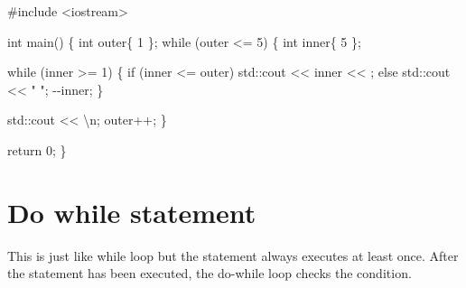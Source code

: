 \documentclass[
  letterpaper,
  DIV=11,
  numbers=noendperiod]{scrreprt}
\newenvironment{Shaded}{\begin{snugshade}}{\end{snugshade}}
\newcommand{\CommentTok}[1]{\textcolor[rgb]{0.37,0.37,0.37}{#1}}
\newcommand{\ControlFlowTok}[1]{\textcolor[rgb]{0.00,0.23,0.31}{#1}}
\newcommand{\DecValTok}[1]{\textcolor[rgb]{0.68,0.00,0.00}{#1}}
\newcommand{\ErrorTok}[1]{\textcolor[rgb]{0.68,0.00,0.00}{#1}}
\newcommand{\FunctionTok}[1]{\textcolor[rgb]{0.28,0.35,0.67}{#1}}
\newcommand{\NormalTok}[1]{\textcolor[rgb]{0.00,0.23,0.31}{#1}}
\newcommand{\SpecialCharTok}[1]{\textcolor[rgb]{0.37,0.37,0.37}{#1}}
\newcommand{\StringTok}[1]{\textcolor[rgb]{0.13,0.47,0.30}{#1}}
\begin{document}
\begin{Shaded}
\begin{Highlighting}[]
\CommentTok{\#include \textless{}iostream\textgreater{}}

\NormalTok{int }\FunctionTok{main}\NormalTok{()}
\NormalTok{\{}
\NormalTok{    int outer\{ }\DecValTok{1}\NormalTok{ \};}
    \ControlFlowTok{while}\NormalTok{ (outer }\SpecialCharTok{\textless{}=} \DecValTok{5}\NormalTok{)}
\NormalTok{    \{}
\NormalTok{        int inner\{ }\DecValTok{5}\NormalTok{ \};}
        
        \ControlFlowTok{while}\NormalTok{ (inner }\SpecialCharTok{\textgreater{}=} \DecValTok{1}\NormalTok{)}
\NormalTok{        \{}
            \ControlFlowTok{if}\NormalTok{ (inner }\SpecialCharTok{\textless{}=}\NormalTok{ outer)}
\NormalTok{                std}\SpecialCharTok{::}\NormalTok{cout }\SpecialCharTok{\textless{}}\ErrorTok{\textless{}}\NormalTok{ inner }\SpecialCharTok{\textless{}}\ErrorTok{\textless{}} \StringTok{\textquotesingle{} \textquotesingle{}}\NormalTok{;}
            \ControlFlowTok{else}
\NormalTok{                std}\SpecialCharTok{::}\NormalTok{cout }\SpecialCharTok{\textless{}}\ErrorTok{\textless{}} \StringTok{"  "}\NormalTok{;}
            \SpecialCharTok{{-}{-}}\NormalTok{inner;}
\NormalTok{        \}}
        
\NormalTok{        std}\SpecialCharTok{::}\NormalTok{cout }\SpecialCharTok{\textless{}}\ErrorTok{\textless{}} \StringTok{\textquotesingle{}}\SpecialCharTok{\textbackslash{}n}\StringTok{\textquotesingle{}}\NormalTok{;}
\NormalTok{        outer}\SpecialCharTok{++}\NormalTok{;}
\NormalTok{    \}}
    
\NormalTok{    return }\DecValTok{0}\NormalTok{;}
\NormalTok{\}}
\end{Highlighting}
\end{Shaded}

\hypertarget{do-while-statement}{%
\section{Do while statement}\label{do-while-statement}}

This is just like while loop but the statement always executes at least
once. After the statement has been executed, the do-while loop checks
the condition.
\end{document}
